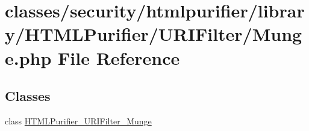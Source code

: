 \hypertarget{Munge_8php}{\section{classes/security/htmlpurifier/library/\+H\+T\+M\+L\+Purifier/\+U\+R\+I\+Filter/\+Munge.php File Reference}
\label{Munge_8php}
}
\subsection*{Classes}
\begin{DoxyCompactItemize}
\item 
class \hyperlink{classHTMLPurifier__URIFilter__Munge}{H\+T\+M\+L\+Purifier\+\_\+\+U\+R\+I\+Filter\+\_\+\+Munge}
\end{DoxyCompactItemize}
